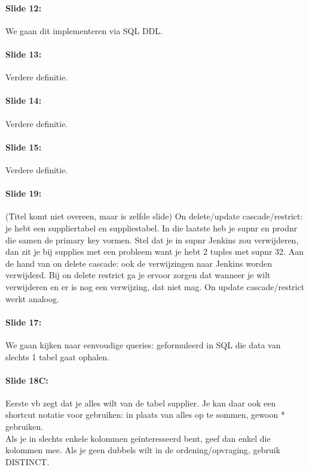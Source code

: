 \documentclass[10pt,a4paper]{report}
\begin{document}
\paragraph{Slide 12:}We gaan dit implementeren via SQL DDL.

\paragraph{Slide 13:}Verdere definitie.

\paragraph{Slide 14:}Verdere definitie.

\paragraph{Slide 15:}Verdere definitie.

\paragraph{Slide 19:}(Titel komt niet overeen, maar is zelfde slide) On delete/update cascade/restrict: je hebt een suppliertabel en suppliestabel. In die laatste heb je supnr en prodnr die samen de primary key vormen. Stel dat je in supnr Jenkins zou verwijderen, dan zit je bij supplies met een probleem want je hebt 2 tuples met supnr 32. Aan de hand van on delete cascade: ook de verwijzingen naar Jenkins worden verwijderd. Bij on delete restrict ga je ervoor zorgen dat wanneer je wilt verwijderen en er is nog een verwijzing, dat niet mag.
On update cascade/restrict werkt analoog.

\paragraph{Slide 17:}We gaan kijken naar eenvoudige queries: geformuleerd in SQL die data van slechts 1 tabel gaat ophalen.

\paragraph{Slide 18C:}Eerste vb zegt dat je alles wilt van de tabel supplier. Je kan daar ook een shortcut notatie voor gebruiken: in plaats van alles op te sommen, gewoon * gebruiken.\\
Als je in slechts enkele kolommen geïnteresseerd bent, geef dan enkel die kolommen mee.
Als je geen dubbels wilt in de ordening/opvraging, gebruik DISTINCT.
\end{document}
